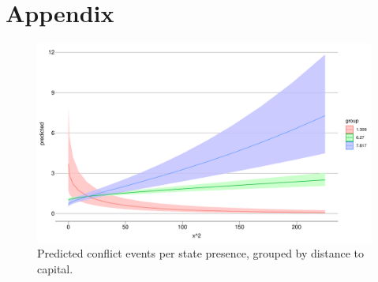 \documentclass[12pt]{article}
\begin{document}

\pagebreak




\pagebreak
\section*{Appendix}








\begin{figure}[htpb]
	\centering
	\includegraphics[width=\linewidth]{"../R/Output/ggStatePlot.pdf"}
	\caption{Predicted conflict events per state presence, grouped by
	distance to capital.}
	\label{state_int}
\end{figure}
\end{document}
